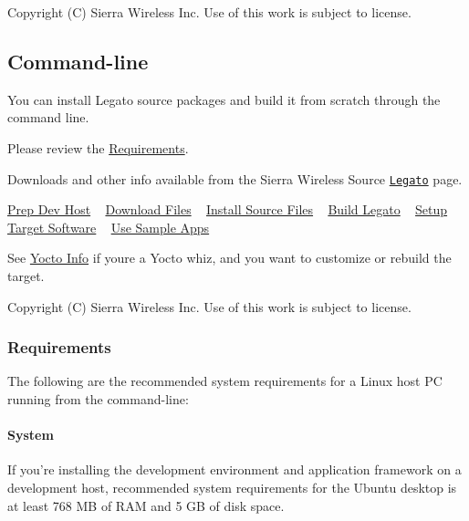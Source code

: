 Copyright (C) Sierra Wireless Inc. Use of this work is subject to license. \hypertarget{getstartedCLinstallMain}{}\subsection{Command-\/line}\label{getstartedCLinstallMain}
You can install Legato source packages and build it from scratch through the command line.

Please review the \hyperlink{getstartedCLrequirements}{Requirements}.

Downloads and other info available from the Sierra Wireless Source \href{http://source.sierrawireless.com/legato/}{\tt Legato} page.





\hyperlink{getstartedPrepDevHost}{Prep Dev Host} ~\newline
 \hyperlink{getstartedDwnLd}{Download Files} ~\newline
 \hyperlink{getstartedCLinstall}{Install Source Files} ~\newline
 \hyperlink{getstartedCLbuild}{Build Legato} ~\newline
 \hyperlink{getstartedTargetSW}{Setup Target Software} ~\newline
 \hyperlink{getstartedSampleApps}{Use Sample Apps}

See \hyperlink{yoctoMain}{Yocto Info} if you\textquotesingle{}re a Yocto whiz, and you want to customize or rebuild the target.





Copyright (C) Sierra Wireless Inc. Use of this work is subject to license. \hypertarget{getstartedCLrequirements}{}\subsubsection{Requirements}\label{getstartedCLrequirements}
The following are the recommended system requirements for a Linux host P\+C running from the command-\/line\+:\hypertarget{getstarted_c_lrequirements_getstartedCLrequirements_system}{}\paragraph{System}\label{getstarted_c_lrequirements_getstartedCLrequirements_system}
If you’re installing the development environment and application framework on a development host, recommended system requirements for the Ubuntu desktop is at least 768 M\+B of R\+A\+M and 5 G\+B of disk space.


